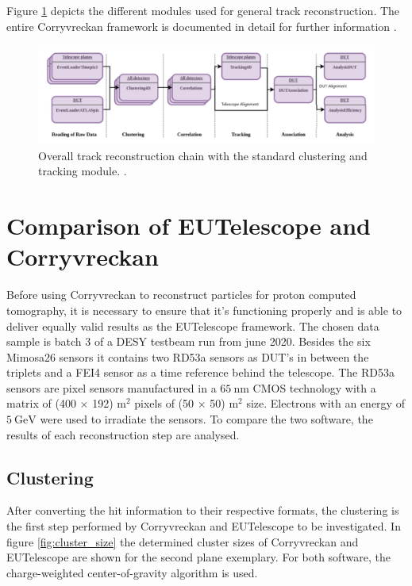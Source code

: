 Figure \ref{fig:corry_track_reco} depicts
the different modules used for general track reconstruction. The entire Corryvreckan framework is documented in detail for further information \cite{corry_manual}.

\begin{figure}
  \centering
  \includegraphics[height=0.3\textwidth]{images/corry.png}
  \caption{Overall track reconstruction chain with the standard clustering and tracking module. \cite{corry_track_reco}.}
  \label{fig:corry_track_reco}
\end{figure}

\chapter{Comparison of EUTelescope and Corryvreckan}\label{make}
Before using Corryvreckan to reconstruct particles for proton computed tomography, it is necessary to ensure that it's functioning properly
and is able to deliver equally valid results as the EUTelescope framework.
The chosen data sample is batch 3 of a DESY testbeam run from june 2020. Besides the six Mimosa26 sensors it contains two RD53a sensors
as DUT's in between the triplets and a FEI4 sensor as a time reference behind the telescope. The RD53a sensors are pixel sensors
manufactured in a $\SI{65}{\nano\meter}$ CMOS technology with a matrix of (400 $\times$ 192) \textmu m$^2$ pixels of
(50 $\times$ 50) \textmu m$^2$ size. Electrons with an energy of $\SI{5}{\GeV}$ were used to irradiate the sensors.
To compare the two software, the results of each
reconstruction step are analysed. \\

\section{Clustering}
After converting the hit information to their respective formats, the clustering is the first step performed by Corryvreckan and EUTelescope
to be investigated.
In figure \ref{fig:cluster_size} the determined cluster sizes of Corryvreckan and EUTelescope are shown for the second plane exemplary.
For both software, the charge-weighted center-of-gravity algorithm is used.

